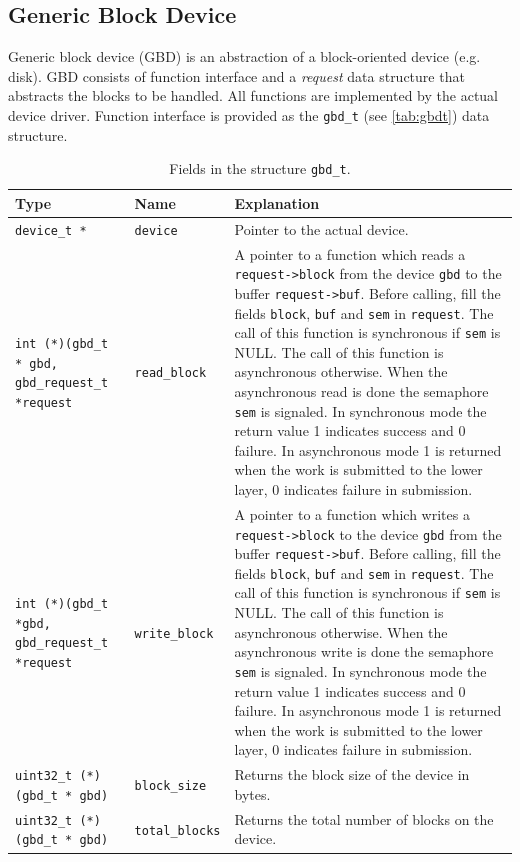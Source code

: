 \documentclass[twoside,a4paper]{report}
\newcommand{\PBS}[1]{\let\temp=\\#1\let\\=\temp}
\newlength{\tablewidth}
\newenvironment{structdescription}{%
\begin{center}%
\begin{tabular}{p{3.5cm}|p{2.5cm}|>{\PBS\raggedright}p{\tablewidth-6\tabcolsep-6cm}}%
\textbf{Type} & \textbf{Name} & \textbf{Explanation} \\ %
}{%
\end{tabular}%
\end{center}%
}
\newcommand{\structfield}[3]{%
\hline%
\texttt{#1} & \texttt{#2} & #3 \\%
}
\begin{document}
\subsection{Generic Block Device}
\label{sec:gbd}


Generic block device (GBD) is an abstraction of a block-oriented
device (e.g. disk). GBD consists of function interface and a
\emph{request} data structure that abstracts the blocks to be handled.
All functions are implemented by the actual device driver. Function
interface is provided as the \texttt{gbd\_t}
 (see \autoref{tab:gbdt}) data
structure.

\begin{table}
\begin{structdescription}

\structfield{device\_t *}{device}{Pointer to the actual device.}

\structfield{int (*)(gbd\_t * gbd, gbd\_request\_t
*request}{read\_block}{A pointer to a function which reads a
\texttt{request->block} from the device \texttt{gbd} to the buffer
\texttt{request->buf}. Before calling, fill the fields \texttt{block},
\texttt{buf} and \texttt{sem} in \texttt{request}. The call of this
function is synchronous if \texttt{sem} is NULL. The call of this
function is asynchronous otherwise. When the asynchronous read is done
the semaphore \texttt{sem} is signaled. In synchronous mode the return
value 1 indicates success and 0 failure. In asynchronous mode 1 is
returned when the work is submitted to the lower layer, 0 indicates
failure in submission.}

\structfield{int (*)(gbd\_t *gbd, gbd\_request\_t
*request}{write\_block}{A pointer to a function which writes a
\texttt{request->block} to the device \texttt{gbd} from the buffer
\texttt{request->buf}. Before calling, fill the fields \texttt{block},
\texttt{buf} and \texttt{sem} in \texttt{request}. The call of this
function is synchronous if \texttt{sem} is NULL. The call of this
function is asynchronous otherwise. When the asynchronous write is
done the semaphore \texttt{sem} is signaled. In synchronous mode the
return value 1 indicates success and 0 failure. In asynchronous mode 1
is returned when the work is submitted to the lower layer, 0 indicates
failure in submission.}

\structfield{uint32\_t (*)(gbd\_t * gbd)}{block\_size}{Returns the
block size of the device in bytes.}

\structfield{uint32\_t (*)(gbd\_t * gbd)}{total\_blocks}{Returns the
total number of blocks on the device.}

\end{structdescription}
\caption{Fields in the structure \texttt{gbd\_t}.}
\label{tab:gbdt}
\end{table}
\end{document}
